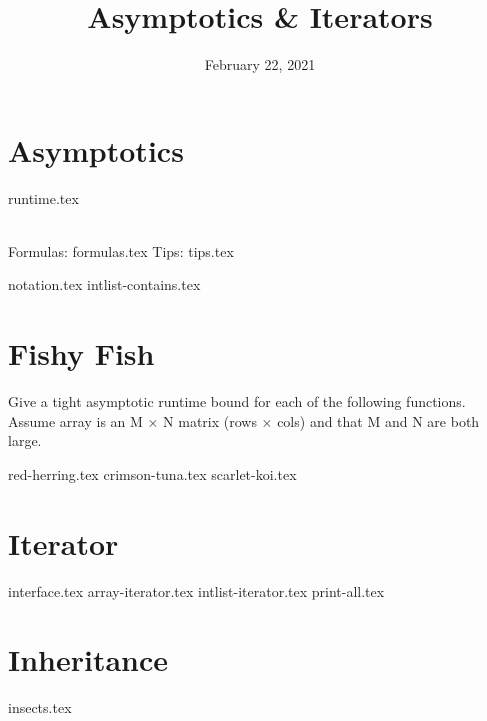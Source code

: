 \documentclass[11pt]{exam}
\title{Asymptotics \& Iterators}
\date{February 22, 2021}
\begin{document}
\maketitle

\section{Asymptotics}
\begin{questions}
{runtime.tex}

\\Formulas:
{formulas.tex}
Tips:
{tips.tex}

{notation.tex}
{intlist-contains.tex}

\section{Fishy Fish}
Give a tight asymptotic runtime bound for each of the following functions. Assume array is an M × N matrix (rows × cols) and that M and N are both large.
\begin{questions}
{red-herring.tex}
{crimson-tuna.tex}
{scarlet-koi.tex}
\end{questions}

\end{questions}

\pagebreak
\section{Iterator}
\begin{questions}
{interface.tex}
{array-iterator.tex}
{intlist-iterator.tex}
{print-all.tex}
\end{questions}

\pagebreak
\section{Inheritance}
\begin{questions}
{insects.tex}
\end{questions}
\end{document}
